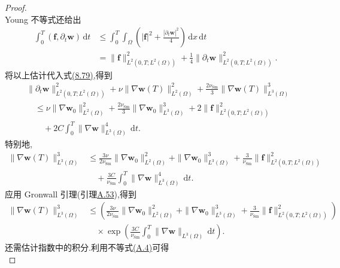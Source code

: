 \begin{proof}
\[\]
Young 不等式还给出
\[
\begin{aligned}
 \int_0^T(\bm{f},\partial_t\bm{w})\,\mathrm{d}t
 &\le\int_0^T\int_\Omega
       \left(|\bm{f}|^2+\frac{|\partial_t\bm{w}|^2}{4}\right)
                           \,\mathrm{d}x\,\mathrm{d}t\\
 &=\|\bm{f}\|_{L^2(0,T;L^2(\Omega))}^2
      +\frac14\|\partial_t\bm{w}\|_{L^2(0,T;L^2(\Omega))}^2.
\end{aligned}
\]
将以上估计代入式\hyperref[eq:smagorinsky-time-derivative-identity]{(8.79)},得到
\begin{equation}\label{eq:smagorinsky-h1-intermediate-estimate}
\begin{aligned}
 &\|\partial_t\bm{w}\|_{L^2(0,T;L^2(\Omega))}^2
  +\nu\|\nabla\bm{w}(T)\|_{L^2(\Omega)}^2
  +\frac{2\nu_{\mathrm{Sm}}}{3}
       \|\nabla\bm{w}(T)\|_{L^3(\Omega)}^3\\
 &\quad\le \nu\|\nabla\bm{w}_0\|_{L^2(\Omega)}^2
  +\frac{2\nu_{\mathrm{Sm}}}{3}
       \|\nabla\bm{w}_0\|_{L^3(\Omega)}^3
  +2\|\bm{f}\|_{L^2(0,T;L^2(\Omega))}^2\\
 &\qquad+2C\int_0^T
       \|\nabla\bm{w}\|_{L^3(\Omega)}^4\,\mathrm{d}t.
\end{aligned}
\end{equation}
特别地,
\[
\begin{aligned}
 \|\nabla\bm{w}(T)\|_{L^3(\Omega)}^3
 &\le \frac{3\nu}{2\nu_{\mathrm{Sm}}}
         \|\nabla\bm{w}_0\|_{L^2(\Omega)}^2
       +\|\nabla\bm{w}_0\|_{L^3(\Omega)}^3
       +\frac{3}{\nu_{\mathrm{Sm}}}
         \|\bm{f}\|_{L^2(0,T;L^2(\Omega))}^2\\
 &\quad+\frac{3C}{\nu_{\mathrm{Sm}}}
       \int_0^T\|\nabla\bm{w}\|_{L^3(\Omega)}^4\,\mathrm{d}t.
\end{aligned}
\]
应用 Gronwall 引理(引理\hyperref[lem:appendix-a-53]{A.53}),得到
\[
\begin{aligned}
 \|\nabla\bm{w}(T)\|_{L^3(\Omega)}^3
 &\le\left(
       \frac{3\nu}{2\nu_{\mathrm{Sm}}}
          \|\nabla\bm{w}_0\|_{L^2(\Omega)}^2
       +\|\nabla\bm{w}_0\|_{L^3(\Omega)}^3
       +\frac{3}{\nu_{\mathrm{Sm}}}
          \|\bm{f}\|_{L^2(0,T;L^2(\Omega))}^2
      \right)\\
 &\quad\times
  \exp\left(
    \frac{3C}{\nu_{\mathrm{Sm}}}
       \int_0^T\|\nabla\bm{w}\|_{L^3(\Omega)}\,\mathrm{d}t
      \right).
\end{aligned}
\]
还需估计指数中的积分.利用不等式\hyperref[eq:appendix-a-4]{(A.4)}可得
\begin{equation}\label{eq:smagorinsky-gradient-time-integral}

\end{equation}
\end{proof}
